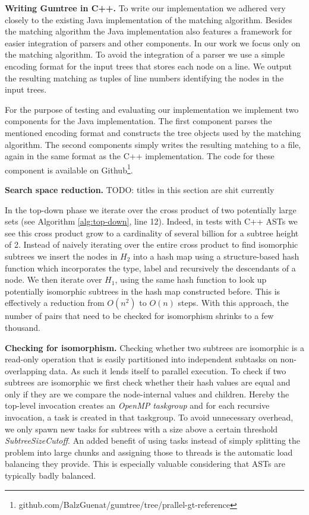 \documentclass[letterpaper]{article}
\newcommand{\mypar}[1]{{\bf #1.}}
\begin{document}
\mypar{Writing Gumtree in C++}
To write our implementation we adhered very closely to the existing Java implementation of the matching algorithm.
Besides the matching algorithm the Java implementation also features a framework for easier integration of parsers and other components.
In our work we focus only on the matching algorithm.
To avoid the integration of a parser we use a simple encoding format for the input trees that stores each node on a line.
We output the resulting matching as tuples of line numbers identifying the nodes in the input trees.

For the purpose of testing and evaluating our implementation we implement two components for the Java implementation.
The first component parses the mentioned encoding format and constructs the tree objects used by the matching algorithm.
The second components simply writes the resulting matching to a file, again in the same format as the C++ implementation.
The code for these component is available on Github\footnote{github.com/BalzGuenat/gumtree/tree/prallel-gt-reference}.

\mypar{Search space reduction}
TODO: titles in this section are shit currently

In the top-down phase we iterate over the cross product of two potentially large sets (see Algorithm \ref{alg:top-down}, line 12).
Indeed, in tests with C++ ASTs we see this cross product grow to a cardinality of several billion for a subtree height of 2.
Instead of naively iterating over the entire cross product to find isomorphic subtrees we insert the nodes in $H_2$ into a hash map using a structure-based hash function which incorporates the type, label and recursively the descendants of a node.
We then iterate over $H_1$, using the same hash function to look up potentially isomorphic subtrees in the hash map constructed before.
This is effectively a reduction from $O(n^2)$ to $O(n)$ steps.
With this approach, the number of pairs that need to be checked for isomorphism shrinks to a few thousand.

\mypar{Checking for isomorphism}
Checking whether two subtrees are isomorphic is a read-only operation that is easily partitioned into independent subtasks on non-overlapping data.
As such it lends itself to parallel execution.
To check if two subtrees are isomorphic we first check whether their hash values are equal and only if they are we compare the node-internal values and children.
Hereby the top-level invocation creates an \emph{OpenMP taskgroup} and for each recursive invocation, a task is created in that taskgroup.
To avoid unnecessary overhead, we only spawn new tasks for subtrees with a size above a certain threshold \emph{SubtreeSizeCutoff}.
An added benefit of using tasks instead of simply splitting the problem into large chunks and assigning those to threads is the automatic load balancing they provide.
This is especially valuable considering that ASTs are typically badly balanced.
\end{document}

